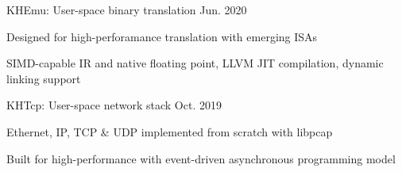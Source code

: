 

\begin{cventries}

  \cventry
    {KHEmu: User-space binary translation}
    {}{}
    {Jun. 2020} %
    {
      \begin{cvitems} %
        \item {Designed for high-perforamance translation with emerging ISAs}
        \item {SIMD-capable IR and native floating point, LLVM JIT compilation, dynamic linking support}
      \end{cvitems}
    }

    \begin{comment}
  \cventry
    {RISC-V experiment platform on Zynq UltraScale+ MPSoC} %
    {}{}
    {Jan. 2020} %
    {
      \begin{cvitems} %
        \item {Based on Rocket Chip from UCB implemented on FPGA, tailored for computer architecture research}
        \item {High-speed debugging based on coherent memories and GPIO JTAG}
      \end{cvitems}
    }
    \end{comment}

  \cventry
    {KHTcp: User-space network stack} %
    {}{}
    {Oct. 2019} %
    {
        \begin{cvitems} %
        \item {Ethernet, IP, TCP \& UDP implemented from scratch with libpcap}
        \item {Built for high-performance with event-driven asynchronous programming model}
        \end{cvitems}
    }

\end{cventries}
